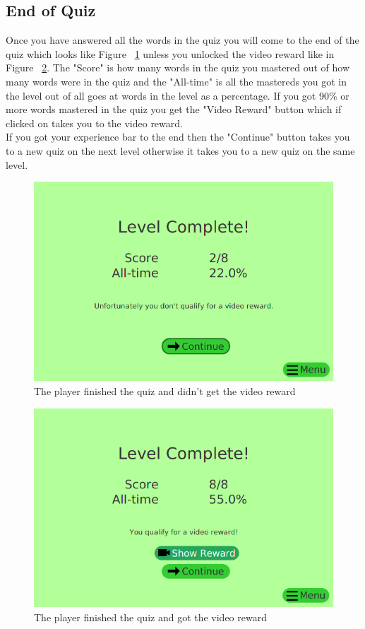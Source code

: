 \documentclass[12pt,a4paper,titlepage,onecolumn]{article}
\begin{document}
	\subsection{End of Quiz}
	Once you have answered all the words in the quiz you will come to the end of the quiz which looks like Figure ~\ref{fig:NewQuizEndNoReward} unless you unlocked the video reward like in Figure ~\ref{fig:NewQuizEndReward}. The "Score" is how many words in the quiz you mastered out of how many words were in the quiz and the "All-time" is all the mastereds you got in the level out of all goes at words in the level as a percentage. If you got 90\% or more words mastered in the quiz you get the "Video Reward" button which if clicked on takes you to the video reward.\\ If you got your experience bar to the end then the "Continue" button takes you to a new quiz on the next level otherwise it takes you to a new quiz on the same level.
	\begin{figure}[h]
	\centering
	\includegraphics[width=1\linewidth]{Figures/NewQuiz/NewQuizEndNoReward}
	\caption[Quiz End without Reward]{The player finished the quiz and didn't get the video reward}
	\label{fig:NewQuizEndNoReward}
	\end{figure}
	\begin{figure}[h]
		\centering
		\includegraphics[width=1\linewidth]{Figures/NewQuiz/NewQuizEndReward}
		\caption[Quiz End with Reward]{The player finished the quiz and got the video reward}
		\label{fig:NewQuizEndReward}
	\end{figure}
\end{document}
